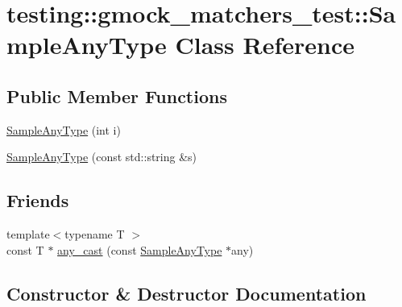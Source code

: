 \hypertarget{classtesting_1_1gmock__matchers__test_1_1SampleAnyType}{}\section{testing\+::gmock\+\_\+matchers\+\_\+test\+::Sample\+Any\+Type Class Reference}
\label{classtesting_1_1gmock__matchers__test_1_1SampleAnyType}
\subsection*{Public Member Functions}
\begin{DoxyCompactItemize}
\item 
\mbox{\hyperlink{classtesting_1_1gmock__matchers__test_1_1SampleAnyType_a8f77e083452210341cb9552fccb4aeab}{Sample\+Any\+Type}} (int i)
\item 
\mbox{\hyperlink{classtesting_1_1gmock__matchers__test_1_1SampleAnyType_a1a9abd19e3f7ca8bc78c05fc5ee2299e}{Sample\+Any\+Type}} (const std\+::string \&s)
\end{DoxyCompactItemize}
\subsection*{Friends}
\begin{DoxyCompactItemize}
\item 
{\footnotesize template$<$typename T $>$ }\\const T $\ast$ \mbox{\hyperlink{classtesting_1_1gmock__matchers__test_1_1SampleAnyType_a5f0f90347eeb986f111c81e6592a74e6}{any\+\_\+cast}} (const \mbox{\hyperlink{classtesting_1_1gmock__matchers__test_1_1SampleAnyType}{Sample\+Any\+Type}} $\ast$any)
\end{DoxyCompactItemize}


\subsection{Constructor \& Destructor Documentation}
\mbox{\label{classtesting_1_1gmock__matchers__test_1_1SampleAnyType_a8f77e083452210341cb9552fccb4aeab}} 
